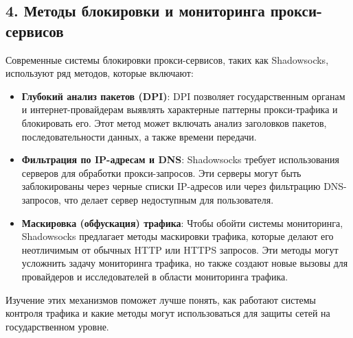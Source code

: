 \documentclass[a4paper,12pt]{article}
\begin{document}
\subsection*{4. Методы блокировки и мониторинга прокси-сервисов}

Современные системы блокировки прокси-сервисов, таких как Shadowsocks, используют ряд методов, которые включают:

\begin{itemize}
    \item \textbf{Глубокий анализ пакетов (DPI)}: DPI позволяет государственным органам и интернет-провайдерам выявлять характерные паттерны прокси-трафика и блокировать его. Этот метод может включать анализ заголовков пакетов, последовательности данных, а также времени передачи.
    \item \textbf{Фильтрация по IP-адресам и DNS}: Shadowsocks требует использования серверов для обработки прокси-запросов. Эти серверы могут быть заблокированы через черные списки IP-адресов или через фильтрацию DNS-запросов, что делает сервер недоступным для пользователя.
    \item \textbf{Маскировка (обфускация) трафика}: Чтобы обойти системы мониторинга, Shadowsocks предлагает методы маскировки трафика, которые делают его неотличимым от обычных HTTP или HTTPS запросов. Эти методы могут усложнить задачу мониторинга трафика, но также создают новые вызовы для провайдеров и исследователей в области мониторинга трафика.
\end{itemize}

Изучение этих механизмов поможет лучше понять, как работают системы контроля трафика и какие методы могут использоваться для защиты сетей на государственном уровне.
\end{document}

